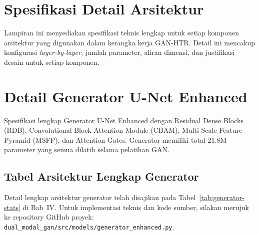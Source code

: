 % 
% 
% 
%

\section{Spesifikasi Detail Arsitektur}
\label{appendix:architecture-details}

Lampiran ini menyediakan spesifikasi teknis lengkap untuk setiap komponen arsitektur yang digunakan dalam kerangka kerja GAN-HTR. Detail ini mencakup konfigurasi \textit{layer-by-layer}, jumlah parameter, aliran dimensi, dan justifikasi desain untuk setiap komponen.


\section{Detail Generator U-Net Enhanced}
\label{appendix:generator-details}

Spesifikasi lengkap Generator U-Net Enhanced dengan Residual Dense Blocks (RDB), Convolutional Block Attention Module (CBAM), Multi-Scale Feature Pyramid (MSFP), dan Attention Gates. Generator memiliki total 21.8M parameter yang semua dilatih selama pelatihan GAN.

\subsection{Tabel Arsitektur Lengkap Generator}

Detail lengkap arsitektur generator telah disajikan pada Tabel~\ref{tab:generator-stats} di Bab~IV. Untuk implementasi teknis dan kode sumber, silakan merujuk ke repository GitHub proyek: \texttt{dual\_modal\_gan/src/models/generator\_enhanced.py}.

